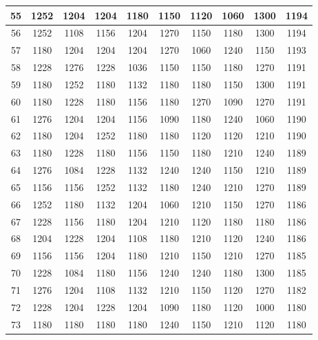 \documentclass{article}
\begin{document}
\begin{table}
\begin{tabular}{c|c|c|c|c|c|c|c|c|c|}
\multicolumn{1}{|c|}{55}  & 1252 & 1204 & 1204 & 1180 & 1150 & 1120 & 1060 & 1300 & 1194 \\ \hline
\multicolumn{1}{|c|}{56}  & 1252 & 1108 & 1156 & 1204 & 1270 & 1150 & 1180 & 1300 & 1194 \\ \hline
\multicolumn{1}{|c|}{57}  & 1180 & 1204 & 1204 & 1204 & 1270 & 1060 & 1240 & 1150 & 1193 \\ \hline
\multicolumn{1}{|c|}{58}  & 1228 & 1276 & 1228 & 1036 & 1150 & 1150 & 1180 & 1270 & 1191 \\ \hline
\multicolumn{1}{|c|}{59}  & 1180 & 1252 & 1180 & 1132 & 1180 & 1180 & 1150 & 1300 & 1191 \\ \hline
\multicolumn{1}{|c|}{60}  & 1180 & 1228 & 1180 & 1156 & 1180 & 1270 & 1090 & 1270 & 1191 \\ \hline
\multicolumn{1}{|c|}{61}  & 1276 & 1204 & 1204 & 1156 & 1090 & 1180 & 1240 & 1060 & 1190 \\ \hline
\multicolumn{1}{|c|}{62}  & 1180 & 1204 & 1252 & 1180 & 1180 & 1120 & 1120 & 1210 & 1190 \\ \hline
\multicolumn{1}{|c|}{63}  & 1180 & 1228 & 1180 & 1156 & 1150 & 1180 & 1210 & 1240 & 1189 \\ \hline
\multicolumn{1}{|c|}{64}  & 1276 & 1084 & 1228 & 1132 & 1240 & 1240 & 1150 & 1210 & 1189 \\ \hline
\multicolumn{1}{|c|}{65}  & 1156 & 1156 & 1252 & 1132 & 1180 & 1240 & 1210 & 1270 & 1189 \\ \hline
\multicolumn{1}{|c|}{66}  & 1252 & 1180 & 1132 & 1204 & 1060 & 1210 & 1150 & 1270 & 1186 \\ \hline
\multicolumn{1}{|c|}{67}  & 1228 & 1156 & 1180 & 1204 & 1210 & 1120 & 1180 & 1180 & 1186 \\ \hline
\multicolumn{1}{|c|}{68}  & 1204 & 1228 & 1204 & 1108 & 1180 & 1210 & 1120 & 1240 & 1186 \\ \hline
\multicolumn{1}{|c|}{69}  & 1156 & 1156 & 1204 & 1180 & 1210 & 1150 & 1210 & 1270 & 1185 \\ \hline
\multicolumn{1}{|c|}{70}  & 1228 & 1084 & 1180 & 1156 & 1240 & 1240 & 1180 & 1300 & 1185 \\ \hline
\multicolumn{1}{|c|}{71}  & 1276 & 1204 & 1108 & 1132 & 1210 & 1150 & 1120 & 1270 & 1182 \\ \hline
\multicolumn{1}{|c|}{72}  & 1228 & 1204 & 1228 & 1204 & 1090 & 1180 & 1120 & 1000 & 1180 \\ \hline
\multicolumn{1}{|c|}{73}  & 1180 & 1180 & 1180 & 1180 & 1240 & 1150 & 1210 & 1120 & 1180 \\ \hline

\end{tabular}
\end{table}
\end{document}
